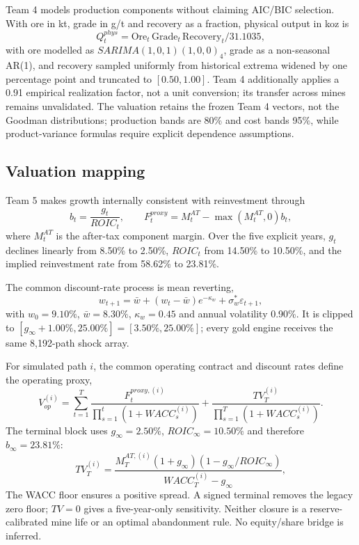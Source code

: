 Team 4 models production components without claiming AIC/BIC selection. With ore in kt, grade in g/t and recovery as a fraction, physical output in koz is
\begin{equation}
Q_t^{phys}=\mathrm{Ore}_t\,\mathrm{Grade}_t\,\mathrm{Recovery}_t/31.1035,
\label{eq:production_formula}
\end{equation}
with ore modelled as $SARIMA(1,0,1)(1,0,0)_4$, grade as a non-seasonal AR(1), and recovery sampled uniformly from historical extrema widened by one percentage point and truncated to $[0.50,1.00]$. Team 4 additionally applies a 0.91 empirical realization factor, not a unit conversion; its transfer across mines remains unvalidated. The valuation retains the frozen Team 4 vectors, not the Goodman distributions; production bands are 80\% and cost bands 95\%, while product-variance formulas require explicit dependence assumptions.

\subsection{Valuation mapping}
Team 5 makes growth internally consistent with reinvestment through
\begin{equation}
b_t=\frac{g_t}{ROIC_t},\qquad
F_t^{proxy}=M_t^{AT}-\max(M_t^{AT},0)b_t,
\label{eq:reinvestment}
\end{equation}
where $M_t^{AT}$ is the after-tax component margin. Over the five explicit years, $g_t$ declines linearly from 8.50\% to 2.50\%, $ROIC_t$ from 14.50\% to 10.50\%, and the implied reinvestment rate from 58.62\% to 23.81\%.

The common discount-rate process is mean reverting,
\begin{equation}
w_{t+1}=\bar w+(w_t-\bar w)e^{-\kappa_w}+\sigma_w^*\varepsilon_{t+1},
\label{eq:wacc_process}
\end{equation}
with $w_0=9.10\%$, $\bar w=8.30\%$, $\kappa_w=0.45$ and annual volatility 0.90\%. It is clipped to $[g_\infty+1.00\%,25.00\%]=[3.50\%,25.00\%]$; every gold engine receives the same 8,192-path shock array.

For simulated path $i$, the common operating contract and discount rates define the operating proxy,
\begin{equation}
V_{op}^{(i)}=\sum_{t=1}^{T}\frac{F_t^{proxy,(i)}}{\prod_{s=1}^{t}(1+WACC_s^{(i)})}
+\frac{TV_T^{(i)}}{\prod_{s=1}^{T}(1+WACC_s^{(i)})}.
\label{eq:stochvalue}
\end{equation}
The terminal block uses $g_\infty=2.50\%$, $ROIC_\infty=10.50\%$ and therefore $b_\infty=23.81\%$:
\begin{equation}
TV_T^{(i)}=\frac{M_T^{AT,(i)}(1+g_\infty)(1-g_\infty/ROIC_\infty)}{WACC_T^{(i)}-g_\infty},
\label{eq:terminal_value}
\end{equation}
The WACC floor ensures a positive spread. A signed terminal removes the legacy zero floor; $TV=0$ gives a five-year-only sensitivity.
Neither closure is a reserve-calibrated mine life or an optimal abandonment rule. No equity/share bridge is inferred.
